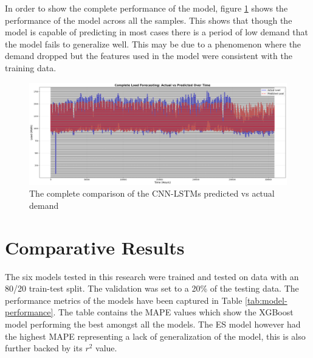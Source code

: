  In order to show the complete performance of the model, figure \ref{fig:cnnlstmpredictionvsactualfull} shows the performance of the model across all the samples. This shows that though the model is capable of predicting in most cases there is a period of low demand that the model fails to generalize well. This may be due to a phenomenon where the demand dropped but the features used in the model were consistent with the training data.
 \begin{figure}[h]
 	\centering
 	\includegraphics[width=0.9\linewidth,height=0.3\textwidth]{Chapters/images/results/cnn_lstm_prediction_vs_actual_full}
 	\caption{The complete comparison of the CNN-LSTMs predicted vs actual demand}
 	\label{fig:cnnlstmpredictionvsactualfull}
 \end{figure}
 
 
 \section{Comparative Results}
 
The six models tested in this research were trained and tested on data with an 80/20 train-test split. The validation was set to a 20\% of the testing data. The performance metrics of the models have been captured in Table \ref{tab:model-performance}. The table contains the MAPE values which show the XGBoost model performing the best amongst all the models. The ES model however had the highest MAPE representing a lack of generalization of the model, this is also further backed by its $r^2$ value.

